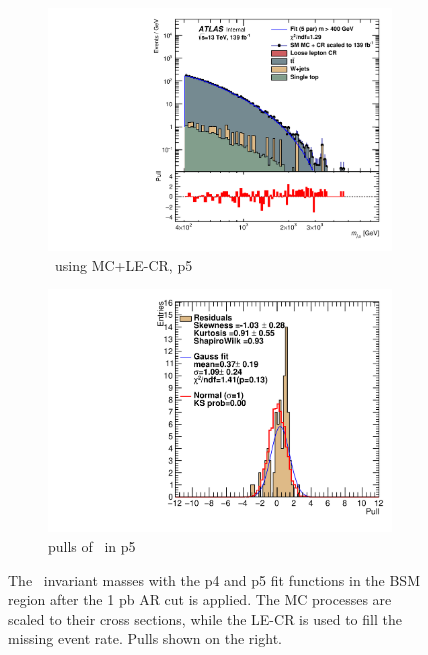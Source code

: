 \begin{figure}[ht]
\begin{subfigure}[h]{0.38\linewidth}
    \includegraphics[scale=0.3]{figs/ch6/fit/variable_nosmooth/p5/1PB/output_SMMCplusCR_Mjm_p5.pdf}%
     \caption{\mjmu \ using MC+LE-CR, p5}
     \end{subfigure}
     \hfill
    \begin{subfigure}[h]{0.4\linewidth}
    \includegraphics[scale=0.32]{figs/ch6/fit/variable_nosmooth/p5/1PB/pull_SMMCplusCR_Mjm_p5.pdf}%
    \caption{pulls of \mjmu \ in p5}
    \end{subfigure}
    \caption{The \mjmu \ invariant masses with the p4 and p5 fit functions in the BSM region after the 1 pb AR cut is applied. The MC processes are scaled to their cross sections, while the LE-CR is used to fill the missing event rate. Pulls shown on the right.}
\label{fig:mjm-fit-pulls-1pb}
\end{figure}

